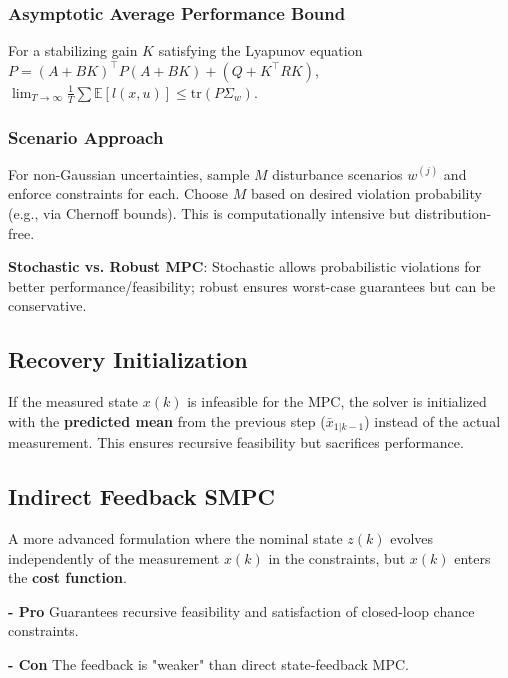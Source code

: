 \subsubsection{Asymptotic Average Performance Bound}
For a stabilizing gain $K$ satisfying the Lyapunov equation $P =
(A+BK)^\top P (A+BK) + (Q + K^\top R K)$,
$\lim_{T \to \infty} \frac{1}{T} \sum \mathbb{E}[l(x,u)] \leq
\text{tr}(P\Sigma_w)$.

\subsubsection{Scenario Approach}
For non-Gaussian uncertainties, sample $M$ disturbance scenarios
$w^{(j)}$ and enforce constraints for each. Choose $M$ based on
desired violation probability (e.g., via Chernoff bounds). This is
computationally intensive but distribution-free.

\textbf{Stochastic vs. Robust MPC}: Stochastic allows probabilistic
violations for better performance/feasibility; robust ensures
worst-case guarantees but can be conservative.

\subsection{Recovery Initialization}
If the measured state $x(k)$ is infeasible for the MPC, the solver is
initialized with the \textbf{predicted mean} from the previous step
($\bar{x}_{1|k-1}$) instead of the actual measurement. This ensures
recursive feasibility but sacrifices performance.

\subsection{Indirect Feedback SMPC}

A more advanced formulation where the nominal state $z(k)$
evolves independently of the measurement $x(k)$ in the constraints,
but $x(k)$ enters the \textbf{cost function}.

\textbf{- Pro}
Guarantees recursive feasibility and satisfaction
of closed-loop chance constraints.

\textbf{- Con}
The feedback is "weaker" than direct state-feedback MPC.

